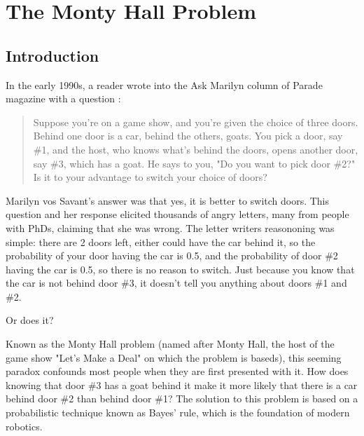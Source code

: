 \documentclass[12pt]{article} %
\begin{document}

\newpage %


\section{The Monty Hall Problem} %
\subsection{Introduction}

In the early 1990s, a reader wrote into the Ask Marilyn column of Parade magazine with a question \cite{Savant:2018}:
\begin{quote}
Suppose you’re on a game show, and you’re given the choice of three doors. Behind one door is a car, behind the others, goats. You pick a door, say \#1, and the host, who knows what’s behind the doors, opens another door, say \#3, which has a goat. He says to you, "Do you want to pick door \#2?" Is it to your advantage to switch your choice of doors?
\end{quote}

Marilyn vos Savant's answer was that yes, it is better to switch doors.  This question and her response elicited thousands of angry letters, many from people with PhDs, claiming that she was wrong.  The letter writers reasononing was simple:  there are 2 doors left, either could have the car behind it, so the probability of your door having the car is 0.5, and the probability of door \#2 having the car is 0.5, so there is no reason to switch.  Just because you know that the car is not behind door \#3, it doesn't tell you anything about doors \#1 and \#2.

Or does it?

Known as the Monty Hall problem (named after Monty Hall, the host of the game show "Let's Make a Deal" on which the problem is baseds), this seeming paradox confounds most people when they are first presented with it.  How does knowing that door \#3 has a goat behind it make it more likely that there is a car behind door \#2 than behind door \#1? The solution to this problem is based on a probabilistic technique known as Bayes' rule, which is the foundation of modern robotics.
\end{document}

